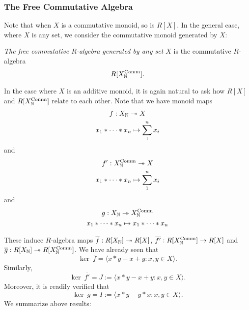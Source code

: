 \subsubsection{The Free Commutative Algebra}
Note that when $X$ is a commutative monoid, so is $R[X]$.
In the general case, where $X$ is any set, we consider the commutative monoid generated by $X$:
\begin{definition}
    \emph{The free commutative $R$-algebra generated by any set $X$} is the commutative $R$-algebra
    $$
        R[X_{\mathbb{N}}^\mathrm{Comm}].
    $$
\end{definition}
In the case where $X$ is an additive monoid, it is again natural to ask how $R[X]$ and $R[X_{\mathbb{N}}^\mathrm{Comm}]$ relate to each other. Note that we have monoid maps
\begin{gather*}
    f: X_{\mathbb{N}} \twoheadrightarrow X\\
    x_1\ast \cdots \ast x_n\mapsto \sum_1^n x_i
\end{gather*}
and
\begin{gather*}
    f' : X_{\mathbb{N}}^\mathrm{Comm} \twoheadrightarrow X\\ 
    x_1\ast \cdots \ast x_n \mapsto \sum_1^n x_i 
\end{gather*}
and 
\begin{gather*}
    g:X_{\mathbb{N}} \twoheadrightarrow X_{\mathbb{N}}^\mathrm{Comm}\\
    x_1\ast \cdots \ast x_n \mapsto x_1\ast\cdots \ast x_n  
\end{gather*}

These induce $R$-algebra maps $\overline{f} : R[X_{\mathbb{N}}] \twoheadrightarrow R[X]$, $\overline{f'}: R[X_{\mathbb{N}}^\mathrm{Comm}] \rightarrow R[X]$ and $\overline{g}:R[X_{\mathbb{N}}] \twoheadrightarrow R[X_{\mathbb{N}}^\mathrm{Comm}]$. We have already seen that 
$$
    \ker \ \overline{f} = \langle x\ast y - x+y : x,y\in X\rangle. 
$$ 
Similarly, 
$$
    \ker \ \overline{f'} = J := \langle x\ast y - x+y : x,y\in X\rangle.
$$
Moreover, it is readily verified that 
$$
    \ker \ \overline{g} = I := \langle x\ast y -y\ast x : x,y\in  X\rangle. 
$$
We summarize above results:

